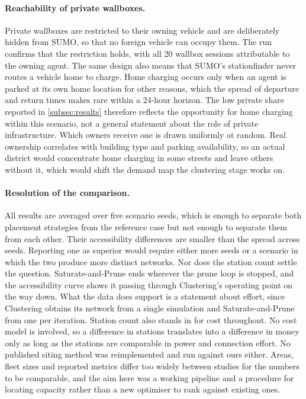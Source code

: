 \paragraph{Reachability of private wallboxes.} Private wallboxes are restricted to their owning vehicle and are deliberately hidden from \ac{SUMO}, so that no foreign vehicle can occupy them. The run confirms that the restriction holds, with all 20 wallbox sessions attributable to the owning agent. The same design also means that \ac{SUMO}'s stationfinder never routes a vehicle home to charge. Home charging occurs only when an agent is parked at its own home location for other reasons, which the spread of departure and return times makes rare within a 24-hour horizon. The low private share reported in \cref{subsec:results} therefore reflects the opportunity for home charging within this scenario, not a general statement about the role of private infrastructure. Which owners receive one is drawn uniformly at random. Real ownership correlates with building type and parking availability, so an actual district would concentrate home charging in some streets and leave others without it, which would shift the demand map the clustering stage works on.

\paragraph{Resolution of the comparison.} All results are averaged over five scenario seeds, which is enough to separate both placement strategies from the reference case but not enough to separate them from each other. Their accessibility differences are smaller than the spread across seeds. Reporting one as superior would require either more seeds or a scenario in which the two produce more distinct networks. Nor does the station count settle the question. Saturate-and-Prune ends wherever the prune loop is stopped, and the accessibility curve shows it passing through Clustering's operating point on the way down. What the data does support is a statement about effort, since Clustering obtains its network from a single simulation and Saturate-and-Prune from one per iteration. Station count also stands in for cost throughout. No cost model is involved, so a difference in stations translates into a difference in money only as long as the stations are comparable in power and connection effort. No published siting method was reimplemented and run against ours either. Areas, fleet sizes and reported metrics differ too widely between studies for the numbers to be comparable, and the aim here was a working pipeline and a procedure for locating capacity rather than a new optimiser to rank against existing ones.

